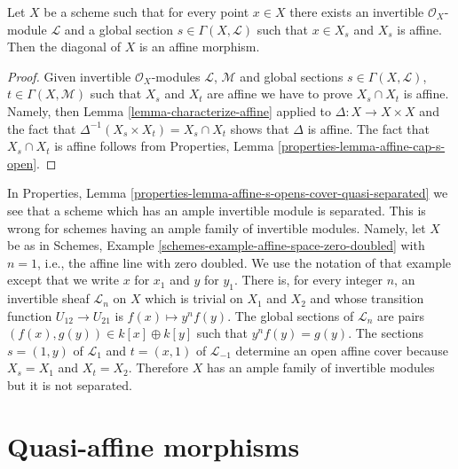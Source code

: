 \begin{lemma}
\label{lemma-affine-diagonal}
Let $X$ be a scheme such that for every point $x \in X$ there exists
an invertible $\mathcal{O}_X$-module $\mathcal{L}$ and a global
section $s \in \Gamma(X, \mathcal{L})$ such that $x \in X_s$ and
$X_s$ is affine. Then the diagonal of $X$ is an affine morphism.
\end{lemma}

\begin{proof}
Given invertible $\mathcal{O}_X$-modules $\mathcal{L}$, $\mathcal{M}$
and global sections $s \in \Gamma(X, \mathcal{L})$,
$t \in \Gamma(X, \mathcal{M})$ such that $X_s$ and $X_t$ are affine
we have to prove $X_s \cap X_t$ is affine. Namely, then
Lemma \ref{lemma-characterize-affine}
applied to $\Delta : X \to X \times X$ and the fact that
$\Delta^{-1}(X_s \times X_t) = X_s \cap X_t$ shows that $\Delta$
is affine. The fact that $X_s \cap X_t$ is affine follows from
Properties, Lemma \ref{properties-lemma-affine-cap-s-open}.
\end{proof}

\begin{remark}
\label{remark-affine-s-opens-cover-family}
In Properties, Lemma \ref{properties-lemma-affine-s-opens-cover-quasi-separated}
we see that a scheme which has an ample invertible module
is separated. This is wrong for schemes having an ample
family of invertible modules. Namely, let $X$ be as in
Schemes, Example \ref{schemes-example-affine-space-zero-doubled}
with $n = 1$, i.e., the affine line with zero doubled.  We use the notation
of that example except that we write $x$ for $x_1$ and $y$
for $y_1$.  There is, for every integer $n$, an invertible
sheaf $\mathcal{L}_n$ on $X$ which is trivial on $X_1$ and
$X_2$ and whose transition function $U_{12} \to U_{21}$ is
$f(x) \mapsto y^n f(y)$.  The global sections of
$\mathcal{L}_n$ are pairs $(f(x), g(y)) \in k[x] \oplus
k[y]$ such that $y^n f(y) = g(y)$.  The sections $s = (1,
y)$ of $\mathcal{L}_1$ and $t = (x, 1)$ of
$\mathcal{L}_{-1}$ determine an open affine cover because
$X_s = X_1$ and $X_t = X_2$.  Therefore $X$ has an
ample family of invertible modules but it is not separated.
\end{remark}









\section{Quasi-affine morphisms}
\label{section-quasi-affine}

